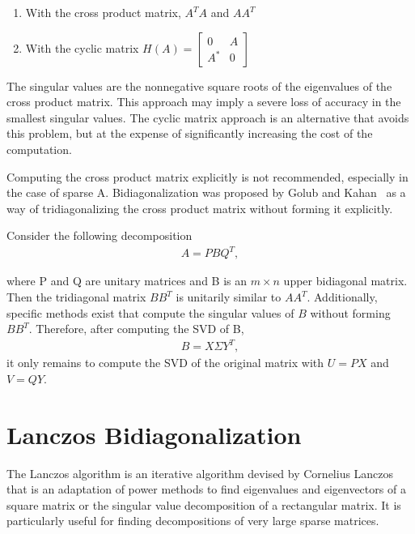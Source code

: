 \begin{enumerate}
    \item With the cross product matrix, $A^TA$ and $AA^T$
    \item With the cyclic matrix $H(A) =
        \begin{bmatrix}
            0   & A\\
            A^* & 0
        \end{bmatrix}$
\end{enumerate}

The singular values are the nonnegative square roots of the eigenvalues of the
cross product matrix. This approach may imply a severe loss of accuracy in the
smallest singular values. The cyclic matrix approach is an alternative that
avoids this problem, but at the expense of significantly increasing the cost of
the computation.

Computing the cross product matrix explicitly is not recommended, especially in
the case of sparse A. Bidiagonalization was proposed by Golub and
Kahan~\cite{golub1965} as a way of tridiagonalizing the cross product matrix
without forming it explicitly.

Consider the following decomposition
\begin{gather*}
    A = P B Q^T,
\end{gather*}

where P and Q are unitary matrices and B is an $m\times n$ upper bidiagonal
matrix. Then the tridiagonal matrix $BB^T$ is unitarily similar to $AA^T$.
Additionally, specific methods exist that compute the singular values of $B$
without forming $BB^T$. Therefore, after computing the SVD of B,
\begin{gather*}
    B = X \Sigma Y^T,
\end{gather*}
it only remains to compute the SVD of the original matrix with $U = PX$ and $V = QY$.

\section{Lanczos Bidiagonalization} %
\label{sec:lanczos_bidiagonalization}

The Lanczos algorithm is an iterative algorithm devised by Cornelius Lanczos
that is an adaptation of power methods to find eigenvalues and eigenvectors of a
square matrix or the singular value decomposition of a rectangular matrix. It is
particularly useful for finding decompositions of very large sparse matrices.

